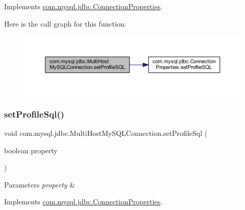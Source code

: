 Implements \mbox{\hyperlink{interfacecom_1_1mysql_1_1jdbc_1_1_connection_properties_a6c91e5a3250a313eee67f7174599be99}{com.\+mysql.\+jdbc.\+Connection\+Properties}}.

Here is the call graph for this function\+:
\nopagebreak
\begin{figure}[H]
\begin{center}
\leavevmode
\includegraphics[width=350pt]{classcom_1_1mysql_1_1jdbc_1_1_multi_host_my_s_q_l_connection_a4cf77def253941b0c23f1ca26f9da972_cgraph}
\end{center}
\end{figure}
\mbox{\label{classcom_1_1mysql_1_1jdbc_1_1_multi_host_my_s_q_l_connection_a3da8b80a49c914ce7bcead678775fbbc}} 
\subsubsection{\texorpdfstring{set\+Profile\+Sql()}{setProfileSql()}}
{\footnotesize\ttfamily void com.\+mysql.\+jdbc.\+Multi\+Host\+My\+S\+Q\+L\+Connection.\+set\+Profile\+Sql (\begin{DoxyParamCaption}\item[{boolean}]{property }\end{DoxyParamCaption})}


\begin{DoxyParams}{Parameters}
{\em property} & \\
\hline
\end{DoxyParams}


Implements \mbox{\hyperlink{interfacecom_1_1mysql_1_1jdbc_1_1_connection_properties_a6e32297fa42ce676613c35580365416a}{com.\+mysql.\+jdbc.\+Connection\+Properties}}.

